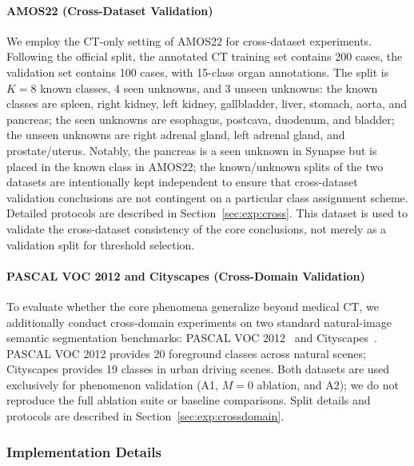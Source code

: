 \documentclass[3p,twocolumn,authoryear]{elsarticle}
\begin{document}
\paragraph{AMOS22 (Cross-Dataset Validation)}
We employ the CT-only setting of AMOS22 for cross-dataset experiments.
Following the official split, the annotated CT training set contains 200 cases,
the validation set contains 100 cases, with 15-class organ annotations.
The split is $K=8$ known classes, 4 seen unknowns, and 3 unseen unknowns:
the known classes are spleen, right kidney, left kidney, gallbladder, liver, stomach,
aorta, and pancreas; the seen unknowns are esophagus, postcava, duodenum, and bladder;
the unseen unknowns are right adrenal gland, left adrenal gland, and prostate/uterus.
Notably, the pancreas is a seen unknown in Synapse but is placed in the known class in
AMOS22; the known/unknown splits of the two datasets are intentionally kept independent
to ensure that cross-dataset validation conclusions are not contingent on a particular
class assignment scheme.
Detailed protocols are described in Section~\ref{sec:exp:cross}.
This dataset is used to validate the cross-dataset consistency of the core conclusions,
not merely as a validation split for threshold selection.

\paragraph{PASCAL VOC 2012 and Cityscapes (Cross-Domain Validation)}
To evaluate whether the core phenomena generalize beyond medical CT, we additionally
conduct cross-domain experiments on two standard natural-image semantic segmentation
benchmarks: PASCAL VOC 2012~\cite{everingham2010pascal} and
Cityscapes~\cite{cordts2016cityscapes}.
PASCAL VOC 2012 provides 20 foreground classes across natural scenes;
Cityscapes provides 19 classes in urban driving scenes.
Both datasets are used exclusively for phenomenon validation (A1, $M{=}0$ ablation,
and A2); we do not reproduce the full ablation suite or baseline comparisons.
Split details and protocols are described in Section~\ref{sec:exp:crossdomain}.

\subsubsection{Implementation Details}\label{sec:exp:setup:impl}
\end{document}
